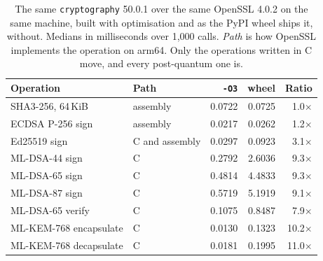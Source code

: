 \begin{table}[t]
\caption{The same \texttt{cryptography} 50.0.1 over the same OpenSSL 4.0.2 on the same machine, built with optimisation and as the PyPI wheel ships it, without. Medians in milliseconds over 1,000 calls. \emph{Path} is how OpenSSL implements the operation on arm64. Only the operations written in C move, and every post-quantum one is.}
\label{tab:buildeffect}
\begin{tabular}{llrrr}
\toprule
Operation & Path & \texttt{-O3} & wheel & Ratio\\
\midrule
SHA3-256, 64\,KiB & assembly & 0.0722 & 0.0725 & 1.0$\times$\\
ECDSA P-256 sign & assembly & 0.0217 & 0.0262 & 1.2$\times$\\
Ed25519 sign & C and assembly & 0.0297 & 0.0923 & 3.1$\times$\\
ML-DSA-44 sign & C & 0.2792 & 2.6036 & 9.3$\times$\\
ML-DSA-65 sign & C & 0.4814 & 4.4833 & 9.3$\times$\\
ML-DSA-87 sign & C & 0.5719 & 5.1919 & 9.1$\times$\\
ML-DSA-65 verify & C & 0.1075 & 0.8487 & 7.9$\times$\\
ML-KEM-768 encapsulate & C & 0.0130 & 0.1323 & 10.2$\times$\\
ML-KEM-768 decapsulate & C & 0.0181 & 0.1995 & 11.0$\times$\\
\bottomrule
\end{tabular}
\end{table}
